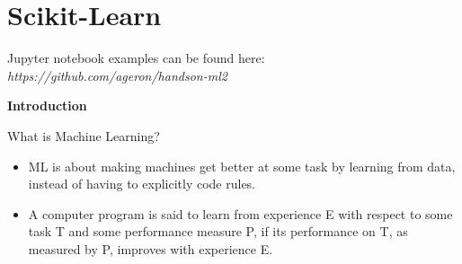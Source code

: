 \section{Scikit-Learn}

Jupyter notebook examples can be found here: \textit{https://github.com/ageron/handson-ml2}\newline

\textbf{Introduction}

What is Machine Learning?
\begin{itemize}
\vspace{-4.0mm}
\item
ML is about making machines get better at some task by learning from data,
instead of having to explicitly code rules.
\item
A computer program is said to learn from experience E with respect to some task T and some performance measure P,
if its performance on T, as measured by P, improves with experience E.
\end{itemize}

